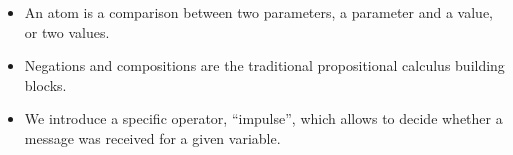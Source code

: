 \documentclass[applsci,article,submit,moreauthors,pdftex,10pt,a4paper]{mdpi}
\begin{document}
%    
%        

\begin{itemize}
    \item An atom is a comparison between two parameters, a parameter and a value, or two values.
    \item Negations and compositions are the traditional propositional calculus building blocks.
    \item We introduce a specific operator, ``impulse'', which allows to decide whether a message was received for a given variable.
\end{itemize}
\end{document}
